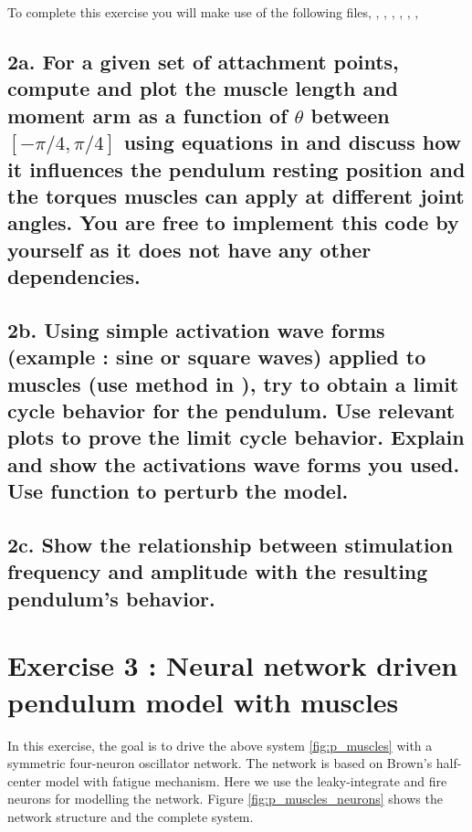 \documentclass{cmc}
\begin{document}
To complete this exercise you will make use of the following files,
, ,
, , ,
,  %

\label{sec:questions}

\subsection*{2a. For a given set of attachment points, compute and
  plot the muscle length and moment arm as a function of $\theta$
  between $[-\pi/4, \pi/4]$ using equations in 
  and discuss how it influences the pendulum resting position and the
  torques muscles can apply at different joint angles. You are free to implement
this code by yourself as it does not have any other dependencies.}
\label{sec:2a}


\subsection*{2b. Using simple activation wave forms (example : sine or
  square waves) applied to muscles (use
   method in
  ), try to obtain a limit cycle behavior for
  the pendulum. Use relevant plots to prove the limit cycle behavior.
  Explain and show the activations wave forms you used. Use
  \newline {} function to perturb the model.}
\label{sec:2c}


\subsection*{2c. Show the relationship between stimulation
  frequency and amplitude with the resulting pendulum's behavior.}
\label{sec:2e}

\newpage
\section*{Exercise 3 : Neural network driven pendulum model with
  muscles}
\label{sec:neur-netw-driv}

In this exercise, the goal is to drive the above system
\ref{fig:p_muscles} with a symmetric four-neuron oscillator
network. The network is based on Brown's half-center model with
fatigue mechanism. Here we use the leaky-integrate and fire neurons
for modelling the network. Figure \ref{fig:p_muscles_neurons} shows
the network structure and the complete system.
\end{document}
